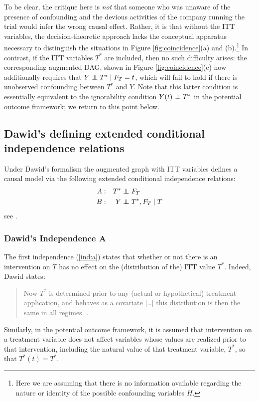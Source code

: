 \documentclass[11pt]{article}
\newcommand\indep{\protect\mathpalette{\protect\independenT}{\perp}}
\def\independenT#1#2{\mathrel{\rlap{$#1#2$}\mkern2.5mu{#1#2}}}
\begin{document}
{To be clear, the critique here is {\it not} that someone who was unaware of the presence of confounding and the devious activities of the company running the trial would infer the wrong causal effect. Rather, it is that without the ITT variables, the decision-theoretic approach lacks the conceptual apparatus necessary to distinguish the situations in Figure \ref{fig:coincidence}(a) and (b).\footnote{Here we are assuming that there is no information available regarding the nature or identity of the possible confounding variables $H$.}
In contrast, if the ITT variables $T^*$ are included, then no such difficulty arises: the corresponding augmented DAG, shown in 
Figure  \ref{fig:coincidence}(c) now additionally requires that $Y \indep T^* \mid F_T=t$, which will fail to hold if there is unobserved confounding between $T^*$ and $Y$. Note that this latter condition is essentially equivalent to the ignorability condition $Y(t) \indep T^*$ in the potential outcome framework; we return to this point below.

\subsection{Dawid's defining extended conditional independence relations}

Under Dawid's formalism the augmented graph with ITT variables defines a causal model via the following extended conditional independence relations:
\begin{align}
A:&& T^*&\indep F_T \label{ind:a}\\
B:&& Y &\indep T^*, F_T \mid T \label{ind:b}
\end{align}
see \citet[Eq. (62), (63)]{dawid:2021}.

\subsubsection{Dawid's Independence A}\label{sec:dawid-a}
The first independence (\ref{ind:a}) states that whether or not there is an intervention on $T$ has no effect on the (distribution of the) ITT value $T^*$. 
Indeed, Dawid states:
\begin{quotation}
Now $T^*$ is determined prior to any (actual or hypothetical) treatment application, and behaves as a covariate [\ldots] this distribution is then the same in all regimes. \citep[\S8, p.54]{dawid:2021}.
\end{quotation}
Similarly, in the potential outcome framework, it is assumed that intervention on a treatment variable does not affect variables whose values are realized prior to that intervention, including the natural value of that treatment variable, $T^*$, so that $T^*(t) = T^*$.

}
\end{document}

